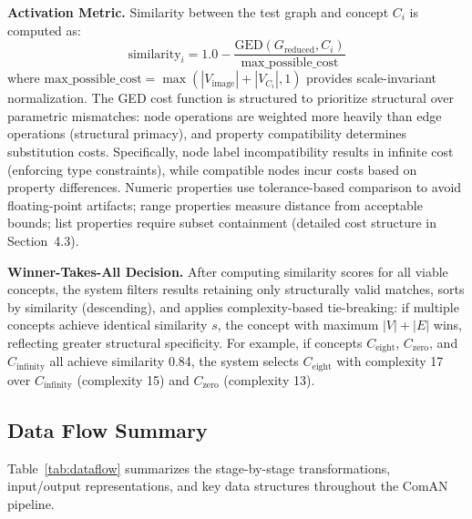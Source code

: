\documentclass[12pt, a4paper]{article}
\begin{document}
\textbf{Activation Metric.} Similarity between the test graph and concept $C_i$ is computed as:
\[
\text{similarity}_i = 1.0 - \frac{\text{GED}(G_{\text{reduced}}, C_i)}{\text{max\_possible\_cost}}
\]
where $\text{max\_possible\_cost} = \max(|V_{\text{image}}| + |V_{C_i}|, 1)$ provides scale-invariant normalization. The GED cost function is structured to prioritize structural over parametric mismatches: node operations are weighted more heavily than edge operations (structural primacy), and property compatibility determines substitution costs. Specifically, node label incompatibility results in infinite cost (enforcing type constraints), while compatible nodes incur costs based on property differences. Numeric properties use tolerance-based comparison to avoid floating-point artifacts; range properties measure distance from acceptable bounds; list properties require subset containment (detailed cost structure in Section~4.3).

\textbf{Winner-Takes-All Decision.} After computing similarity scores for all viable concepts, the system filters results retaining only structurally valid matches, sorts by similarity (descending), and applies complexity-based tie-breaking: if multiple concepts achieve identical similarity $s$, the concept with maximum $|V| + |E|$ wins, reflecting greater structural specificity. For example, if concepts $C_{\text{eight}}$, $C_{\text{zero}}$, and $C_{\text{infinity}}$ all achieve similarity 0.84, the system selects $C_{\text{eight}}$ with complexity 17 over $C_{\text{infinity}}$ (complexity 15) and $C_{\text{zero}}$ (complexity 13).

\subsection{Data Flow Summary}

Table~\ref{tab:dataflow} summarizes the stage-by-stage transformations, input/output representations, and key data structures throughout the ComAN pipeline.
\end{document}
